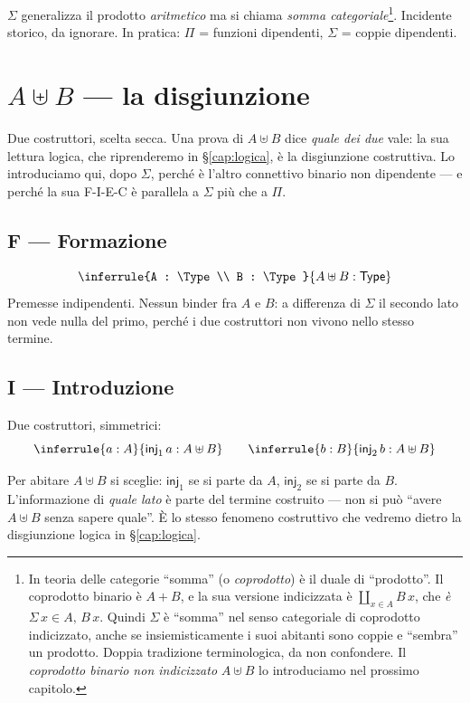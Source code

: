 \noindent $\Sigma$ generalizza il prodotto \emph{aritmetico} ma si chiama \emph{somma categoriale}\footnote{In teoria delle categorie ``somma'' (o \emph{coprodotto}) \`e il duale di ``prodotto''. Il coprodotto binario \`e $A + B$, e la sua versione indicizzata \`e $\coprod_{x \in A} B\,x$, che \emph{\`e} $\Sigma\,x\!\in\!A,\,B\,x$. Quindi $\Sigma$ \`e ``somma'' nel senso categoriale di coprodotto indicizzato, anche se insiemisticamente i suoi abitanti sono coppie e ``sembra'' un prodotto. Doppia tradizione terminologica, da non confondere. Il \emph{coprodotto binario non indicizzato} $A \uplus B$ lo introduciamo nel prossimo capitolo.}. Incidente storico, da ignorare. In pratica: $\Pi$ = funzioni dipendenti, $\Sigma$ = coppie dipendenti.

\chapter{$A \uplus B$ --- la disgiunzione}\label{cap:coproduct}

Due costruttori, scelta secca. Una prova di $A \uplus B$ dice \emph{quale dei due} vale: la sua lettura logica, che riprenderemo in \S\ref{cap:logica}, \`e la disgiunzione costruttiva. Lo introduciamo qui, dopo $\Sigma$, perch\'e \`e l'altro connettivo binario non dipendente --- e perch\'e la sua F-I-E-C \`e parallela a $\Sigma$ pi\`u che a $\Pi$.

\section*{F --- Formazione}
\[
\inferrule{A : \Type \\ B : \Type}{A \uplus B : \Type}
\]
Premesse indipendenti. Nessun binder fra $A$ e $B$: a differenza di $\Sigma$ il secondo lato non vede nulla del primo, perch\'e i due costruttori non vivono nello stesso termine.

\section*{I --- Introduzione}
Due costruttori, simmetrici:
\[
\inferrule{a : A}{\mathsf{inj}_1\,a : A \uplus B}
\qquad
\inferrule{b : B}{\mathsf{inj}_2\,b : A \uplus B}
\]

Per abitare $A \uplus B$ si sceglie: $\mathsf{inj}_1$ se si parte da $A$, $\mathsf{inj}_2$ se si parte da $B$. L'informazione di \emph{quale lato} \`e parte del termine costruito --- non si pu\`o ``avere $A \uplus B$ senza sapere quale''. \`E lo stesso fenomeno costruttivo che vedremo dietro la disgiunzione logica in \S\ref{cap:logica}.


